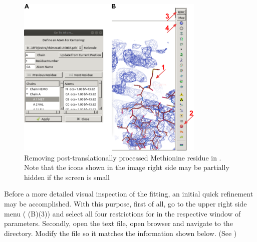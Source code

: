   \begin{figure}[H]
  \centering 
  \captionsetup{width=.7\linewidth} 
  \includegraphics[width=0.80\textwidth]{Images/Fig27}
  \caption{Removing post-translationally processed Methionine residue in \coot. Note that the icons shown in the image right side may be partially hidden if the screen is small}
  \label{fig:coot_go_to_atom}
  \end{figure}
  
  Before a more detailed visual inspection of the  fitting, an initial quick refinement may be accomplished. With this purpose, first of all, go to the upper right side menu ( (B)(3)) and select all four restrictions for  in the respective window of parameters. Secondly, open the  text file, 
  open \scipion browser and navigate to the  directory. Modify the file so it matches the information shown below. (See )\\
  \ttt{[myvars]}\\
  \\
  \\
  \\
  \\
  \\
  
